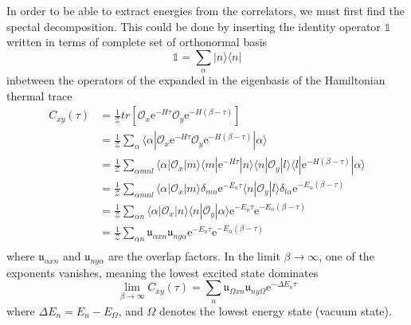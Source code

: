 In order to be able to extract energies from the correlators, we must first find the spectal decomposition. This could be done by inserting the identity operator $\mathds{1}$ written in terms of complete set of orthonormal basis
\begin{equation}
    \mathds{1} = \sum_\alpha | n \rangle \langle n |
\end{equation}
inbetween the operators of the expanded in the eigenbasis of the Hamiltonian thermal trace
\begin{equation}
    \begin{aligned}
        C_{xy}(\tau) &= \frac{1}{\mathcal{Z}}tr\left[ \mathcal{O}_x\mathrm{e}^{-H\tau}\mathcal{O}_y\mathrm{e}^{-H(\beta - \tau)} \right] 
        \\
        &= \frac{1}{\mathcal{Z}}\sum_\alpha\langle \alpha | \mathcal{O}_x\mathrm{e}^{-H\tau}\mathcal{O}_y\mathrm{e}^{-H(\beta - \tau)} | \alpha \rangle 
        \\
        &= \frac{1}{\mathcal{Z}}\sum_{\alpha mnl} \langle \alpha | \mathcal{O}_x | m \rangle \langle m | \mathrm{e}^{-H\tau} | n \rangle \langle n | \mathcal{O}_y | l \rangle \langle l | \mathrm{e}^{-H(\beta - \tau)} | \alpha \rangle 
        \\
        &= \frac{1}{\mathcal{Z}}\sum_{\alpha mnl}\langle \alpha | \mathcal{O}_x | m \rangle \delta_{mn}\mathrm{e}^{-E_n\tau} \langle n | \mathcal{O}_y | l \rangle \delta_{l\alpha}\mathrm{e}^{-E_\alpha(\beta - \tau)}
        \\
        &= \frac{1}{\mathcal{Z}}\sum_{\alpha n}\langle \alpha | \mathcal{O}_x | n \rangle \langle n | \mathcal{O}_y | \alpha \rangle \mathrm{e}^{-E_n\tau} \mathrm{e}^{-E_\alpha(\beta - \tau)}
        \\
        &= \frac{1}{\mathcal{Z}}\sum_{\alpha n} \mathfrak{u}_{\alpha xn} \mathfrak{u}_{ ny\alpha} \mathrm{e}^{-E_n\tau} \mathrm{e}^{-E_\alpha(\beta - \tau)}
        \\
    \end{aligned}
\end{equation}
where $\mathfrak{u}_{\alpha xn}$ and $\mathfrak{u}_{ ny\alpha}$ are the overlap factors. In the limit $\beta \to \infty$, one of the exponents vanishes, meaning the lowest excited state dominates
\begin{equation}
    \lim_{\beta \to \infty} C_{xy}(\tau) = \sum_{n} \mathfrak{u}_{\Omega xn} \mathfrak{u}_{ ny\Omega} \mathrm{e}^{-\Delta E_n\tau}
\end{equation}
where $\Delta E_n = E_n - E_\Omega$, and $\Omega$ denotes the lowest energy state (vacuum state).

